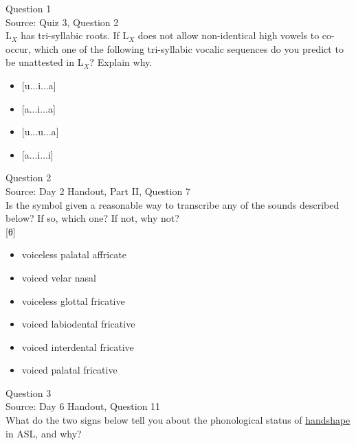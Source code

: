 \documentclass[12pt]{article}
\begin{document}
{\large Question 1}\\

Source: Quiz 3, Question 2\\

L$_X$ has tri-syllabic roots. If L$_X$ does not allow non-identical high vowels to co-occur, which one of the following tri-syllabic vocalic sequences do you predict to be unattested in L$_X$? Explain why.\\

\begin{itemize} \item {[u...i...a]} \item {[a...i...a]} \item {[u...u...a]} \item {[a...i...i]} \end{itemize}


\newpage

{\large Question 2}\\

Source: Day 2 Handout, Part II, Question 7\\

Is the symbol given a reasonable way to transcribe any of the sounds described below? If so, which one? If not, why not?\\

{[θ]}

\begin{itemize} \item voiceless palatal affricate \item voiced velar nasal \item voiceless glottal fricative \item voiced labiodental fricative \item voiced interdental fricative \item voiced palatal fricative \end{itemize}


\newpage

{\large Question 3}\\

Source: Day 6 Handout, Question 11\\

What do the two signs below tell you about the phonological status of \underline{handshape} in ASL, and why?\\
\end{document}
